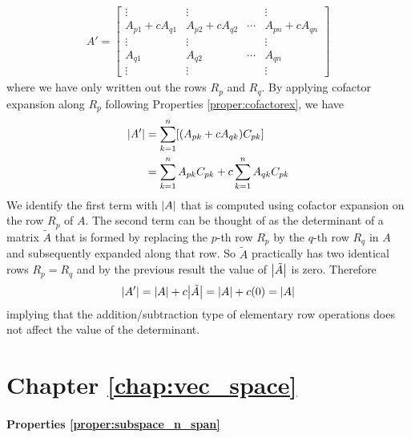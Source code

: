 \begin{align*}
A' = 
\begin{bmatrix}
\vdots & \vdots & & \vdots\\
A_{p1} + cA_{q1} & A_{p2} + cA_{q2} & \cdots & A_{pn} + cA_{qn} \\
\vdots & \vdots & & \vdots\\
A_{q1} & A_{q2} & \cdots & A_{qn} \\
\vdots & \vdots & & \vdots
\end{bmatrix}
\end{align*}
where we have only written out the rows $R_p$ and $R_q$. By applying cofactor expansion along $R_p$ following Properties \ref{proper:cofactorex}, we have
\begin{align}
\abs{A'} &= \sum_{k=1}^{n} [(A_{pk} + cA_{qk}) C_{pk}] \nonumber \\
&= \sum_{k=1}^{n} A_{pk}C_{pk} + c\sum_{k=1}^{n} A_{qk}C_{pk}
\end{align}
We identify the first term with $\abs{A}$ that is computed using cofactor expansion on the row $R_p$ of $A$. The second term can be thought of as the determinant of a matrix $\tilde{A}$ that is formed by replacing the $p$-th row $R_p$ by the $q$-th row $R_q$ in $A$ and subsequently expanded along that row. So $\tilde{A}$ practically has two identical rows $R_p = R_q$ and by the previous result the value of $\abs{\tilde{A}}$ is zero. Therefore
\begin{align}
\abs{A'} = \abs{A} + c\abs{\tilde{A}} = \abs{A} + c(0) = \abs{A}    
\end{align} implying that the addition/subtraction type of elementary row operations does not affect the value of the determinant.

\section{Chapter \ref*{chap:vec_space}}
\label{section:vecspaceappend}

\paragraph{Properties \ref*{proper:subspace_n_span}}  

